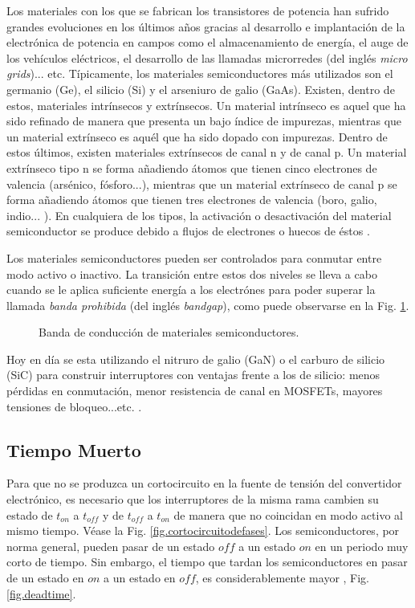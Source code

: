 \documentclass{report}
\begin{document}
    Los materiales con los que se fabrican los transistores de potencia han sufrido grandes evoluciones en los últimos años gracias al desarrollo e implantación de la electrónica de potencia en campos como el almacenamiento de energía, el auge de los vehículos eléctricos, el desarrollo de las llamadas microrredes (del inglés \textit{micro grids})... etc. 
    Típicamente, los materiales semiconductores más utilizados son el germanio (Ge), el silicio (Si) y el arseniuro de galio (GaAs). Existen, dentro de estos, materiales intrínsecos y extrínsecos. Un material intrínseco es aquel que ha sido refinado de manera que presenta un bajo índice de impurezas, mientras que un material extrínseco es aquél que ha sido dopado con impurezas. Dentro de estos últimos, existen materiales extrínsecos de canal n y de canal p. Un material extrínseco tipo n se forma añadiendo átomos que tienen cinco electrones de valencia (arsénico, fósforo...), mientras que un material extrínseco de canal p se forma añadiendo átomos que tienen tres electrones de valencia (boro, galio, indio... ). En cualquiera de los tipos, la activación o desactivación del material semiconductor se produce debido a flujos de electrones o huecos de éstos \cite{uno}.
    
    Los materiales semiconductores pueden ser controlados para conmutar entre modo activo o inactivo. La transición entre estos dos niveles se lleva a cabo cuando se le aplica suficiente energía a los electrónes para poder superar la llamada \textit{banda prohibida} (del inglés \textit{bandgap}), como puede observarse en la Fig. \ref{fig.bandadeconduccion}. 
    \begin{figure}[!h]
        \begin{center}
        \end{center}
        \caption{Banda de conducción de materiales semiconductores\cite{uno}.}
        \label{fig.bandadeconduccion}
        \end{figure}
    
    Hoy en día se esta utilizando el nitruro de galio (GaN) o el carburo de silicio (SiC) para construir interruptores con ventajas frente a los de silicio: menos pérdidas en conmutación, menor resistencia de canal en MOSFETs, mayores tensiones de bloqueo...etc. \cite{veintinueve}.
    
\subsection{Tiempo Muerto} \label{sec.tiempomuerto}
Para que no se produzca un cortocircuito en la fuente de tensión del convertidor electrónico, es necesario que los interruptores de la misma rama cambien su estado de $t_{on}$ a $t_{off}$ y de $t_{off}$ a $t_{on}$ de manera que no coincidan en modo activo al mismo tiempo. Véase la Fig. \ref{fig.cortocircuitodefases}. Los semiconductores, por norma general, pueden pasar de un estado $off$ a un estado $on$ en un periodo muy corto de tiempo. Sin embargo, el tiempo que tardan los semiconductores en pasar de un estado en $on$ a un estado en $off$, es considerablemente mayor \cite{uno}, Fig. \ref{fig.deadtime}.
\end{document}
